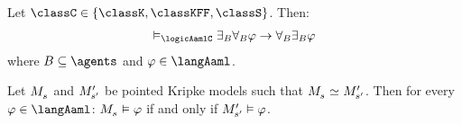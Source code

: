 \begin{proposition}\label{aaml-church-rosser}
Let $\classC \in \{\classK, \classKFF, \classS\}$. Then:
$$
\begin{array}{l}
    \entails_\logicAamlC \somerefsBs \allrefsBs \phi \implies \allrefsBs \somerefsBs \phi
\end{array}
$$
where $\agentsB \subseteq \agents$ and $\phi \in \langAaml$.
\end{proposition}

\begin{proposition}
Let $\kPModel{\kStateS}$ and ${M^{\prime}_{{s}^{\prime}}}$ be pointed Kripke models such that $\kPModel{\kStateS} \bisimilar \kPModelP{\kStateSP}$.
Then for every $\phi \in \langAaml$: $\kPModel{\kStateS} \entails \phi$ if and only if ${M^{\prime}_{{s}^{\prime}}} \vDash \varphi$.
\end{proposition}
